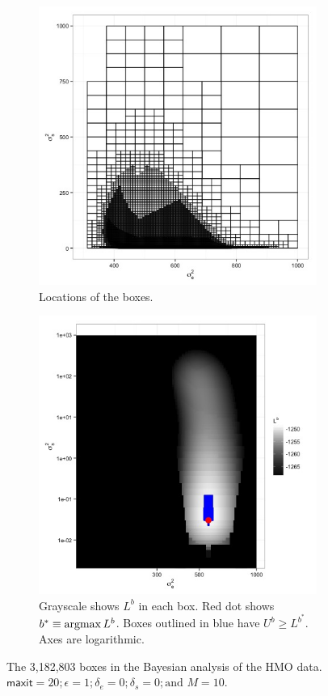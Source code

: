 \documentclass{report}
\newcommand{\textcompute}{\textsf}
\newcommand{\maxit}{\textcompute{maxit}}
\newcommand{\argmax}{\operatornamewithlimits{argmax}}
\begin{document}
\begin{figure}
  \begin{subfigure}{.5\textwidth}
	\centering
	\includegraphics[width=.8\linewidth]{figs/hmo_HH11Bayes_boxes.jpg}
	\caption{Locations of the boxes.}
	\label{fig:hmoBayesboxes}
  \end{subfigure}
  \begin{subfigure}{.5\textwidth}
	\centering
	\includegraphics[width=.8\linewidth]{figs/hmo_HH11Bayes_rll.jpg}
	\caption{Grayscale shows $L^b$ in each box.  Red dot shows $b^* \equiv\argmax L^b$.
	Boxes outlined in blue have $U^b \ge L^{b^*}$.  Axes are logarithmic.}
	\label{fig:hmoBayesrll}
  \end{subfigure}
  \caption{The 3,182,803 boxes in the Bayesian analysis of the HMO data.
               $\maxit=20; \epsilon=1; \delta_e=0; \delta_s=0; \text{and\ } M=10$.}
  \label{fig:hmoBayes}
\end{figure}
\end{document}
